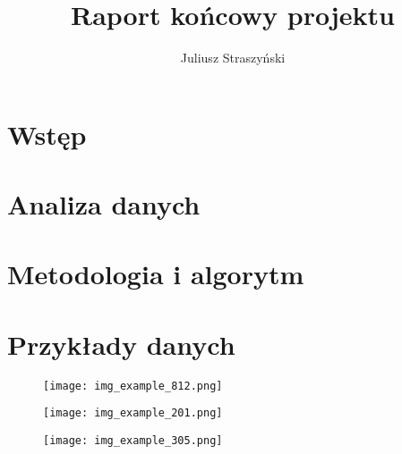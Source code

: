 \documentclass[10pt, a4paper]{article}
\begin{document}
    \author{Juliusz Straszyński}
    \title{Raport końcowy projektu}
    \maketitle
    \tableofcontents


    \section{Wstęp}\label{sec:wstep}
    


    \section{Analiza danych}\label{sec:analiza-danych}
    


    \section{Metodologia i algorytm}\label{sec:metodologia-i-algorytm}
    
    \printbibliography
    \clearpage
    \appendix
    \section{Przykłady danych}\label{sec:raw-examples}
    \begin{figure}
        \texttt{[image: img\_example\_812.png]}
    \end{figure}
    \begin{figure}
        \texttt{[image: img\_example\_201.png]}
    \end{figure}
    \begin{figure}
        \texttt{[image: img\_example\_305.png]}
    \end{figure}
\end{document}
